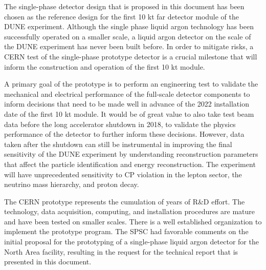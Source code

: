 \label{summary}
The single-phase detector design that is proposed in this document has been chosen as the reference design for the first 10 kt far detector module of the DUNE experiment.  Although the single phase liquid argon technology has been successfully operated on a smaller scale, a liquid argon detector on the scale of the DUNE experiment has never been built before.  In order to mitigate risks, a CERN test of the single-phase prototype detector is a crucial milestone that will inform the construction and operation of the first 10 kt module.

A primary goal of the prototype is to perform an engineering test to validate the mechanical and electrical performance of the full-scale detector components to inform decisions that need to be made well in advance of the 2022 installation date of the first 10 kt module.  It would be of great value to also take test beam data before the long accelerator shutdown in 2018, to validate the physics performance of the detector to further inform these decisions.  However, data taken after the shutdown can still be instrumental in improving the final sensitivity of the DUNE experiment by understanding reconstruction parameters that affect the particle identification and energy reconstruction.   The experiment will have unprecedented sensitivity to CP violation in the lepton sector, the neutrino mass hierarchy, and proton decay.   

The CERN prototype represents the cumulation of years of R&D effort.  The technology, data acquisition, computing, and installation procedures are mature and have been tested on smaller scales.  There is a well established organization to implement the prototype program.  The SPSC had favorable comments on the initial proposal for the prototyping of a single-phase liquid argon detector for the
North Area facility, resulting in the request for the technical report that is presented in this document.